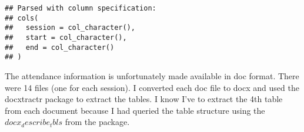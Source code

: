 \documentclass[11pt,]{article}
\newenvironment{Shaded}{\begin{snugshade}}{\end{snugshade}}
\newcommand{\KeywordTok}[1]{\textcolor[rgb]{0.13,0.29,0.53}{\textbf{#1}}}
\newcommand{\DecValTok}[1]{\textcolor[rgb]{0.00,0.00,0.81}{#1}}
\newcommand{\StringTok}[1]{\textcolor[rgb]{0.31,0.60,0.02}{#1}}
\newcommand{\ControlFlowTok}[1]{\textcolor[rgb]{0.13,0.29,0.53}{\textbf{#1}}}
\newcommand{\OperatorTok}[1]{\textcolor[rgb]{0.81,0.36,0.00}{\textbf{#1}}}
\newcommand{\NormalTok}[1]{#1}
\begin{document}
\begin{verbatim}
## Parsed with column specification:
## cols(
##   session = col_character(),
##   start = col_character(),
##   end = col_character()
## )
\end{verbatim}

\begin{Shaded}
\end{Shaded}

The attendance information is unfortunately made available in doc
format. There were 14 files (one for each session). I converted each doc
file to docx and used the docxtractr package to extract the tables. I
know I've to extract the 4th table from each document because I had
queried the table structure using the \(docx_describe_tbls\) from the
package.

\begin{Shaded}
\end{Shaded}
\end{document}
